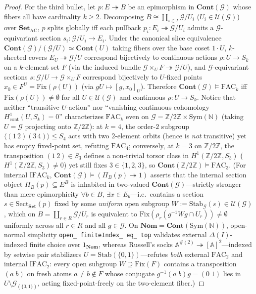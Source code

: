 \begin{proof}
For the third bullet, let $p : E \twoheadrightarrow B$ be an epimorphism in $\mathbf{Cont}(\mathcal{G})$ whose fibers all have cardinality $k \ge 2$. Decomposing $B \cong \coprod_{i \in I} \mathcal{G}/U_i$ ($U_i \in \mathcal{U}(\mathcal{G})$) over $\mathbf{Set}_{\mathrm{AC}}$, $p$ splits globally iff each pullback $p_i : E_i \twoheadrightarrow \mathcal{G}/U_i$ admits a $\mathcal{G}$-equivariant section $s_i : \mathcal{G}/U_i \to E_i$. Under the canonical slice equivalence $\mathbf{Cont}(\mathcal{G})/(\mathcal{G}/U) \simeq \mathbf{Cont}(U)$ taking fibers over the base coset $1 \cdot U$, $k$-sheeted covers $E_U \twoheadrightarrow \mathcal{G}/U$ correspond bijectively to continuous actions $\rho : U \to S_k$ on a $k$-element set $F$ (via the induced bundle $\mathcal{G} \times_U F \twoheadrightarrow \mathcal{G}/U$), and $\mathcal{G}$-equivariant sections $s : \mathcal{G}/U \to \mathcal{G} \times_U F$ correspond bijectively to $U$-fixed points $x_0 \in F^U = \mathrm{Fix}(\rho(U))$ (via $g U \mapsto [g, x_0]_U$). Therefore $\mathbf{Cont}(\mathcal{G}) \models \mathrm{FAC}_k$ iff $\mathrm{Fix}(\rho(U)) \neq \emptyset$ for all $U \in \mathcal{U}(\mathcal{G})$ and continuous $\rho : U \to S_k$. Notice that neither ``transitive $U$-action'' nor ``vanishing continuous cohomology $H^1_{\mathrm{cont}}(U, S_k) = 0$'' characterizes $\mathrm{FAC}_k$ even on $\mathcal{G} = \mathbb{Z}/2\mathbb{Z} \times \mathrm{Sym}(\mathbb{N})$ (taking $U = \mathcal{G}$ projecting onto $\mathbb{Z}/2\mathbb{Z}$): at $k = 4$, the order-$2$ subgroup $\langle (1\,2)(3\,4) \rangle \le S_4$ acts with two $2$-element orbits (hence is \emph{not} transitive) yet has empty fixed-point set, refuting $\mathrm{FAC}_4$; conversely, at $k = 3$ on $\mathbb{Z}/2\mathbb{Z}$, the transposition $(1\,2) \in S_3$ defines a non-trivial torsor class in $H^1(\mathbb{Z}/2\mathbb{Z}, S_3)$ ($H^1(\mathbb{Z}/2\mathbb{Z}, S_3) \neq 0$) yet still fixes $3 \in \{1, 2, 3\}$, so $\mathbf{Cont}(\mathbb{Z}/2\mathbb{Z}) \models \mathrm{FAC}_3$. (For internal $\mathrm{IFAC}_k$, $\mathbf{Cont}(\mathcal{G}) \models (\Pi_B(p) \twoheadrightarrow 1)$ asserts that the internal section object $\Pi_B(p) \subseteq E^B$ is inhabited in two-valued $\mathbf{Cont}(\mathcal{G})$---strictly stronger than mere epimorphicity $\forall b \in B,\, \exists x \in E_b$---i.e.\ contains a section $s \in \mathrm{Sect}_{\mathbf{Set}}(p)$ fixed by some \emph{uniform} open subgroup $W := \mathrm{Stab}_{\mathcal{G}}(s) \in \mathcal{U}(\mathcal{G})$, which on $B = \coprod_{r \in R} \mathcal{G}/U_r$ is equivalent to $\mathrm{Fix}(\rho_r(g^{-1} W g \cap U_r)) \neq \emptyset$ uniformly across all $r \in R$ and all $g \in \mathcal{G}$. On $\mathbf{Nom} = \mathbf{Cont}(\mathrm{Sym}(\mathbb{N}))$, open-normal simplicity \texttt{open\_ finiteIndex\_ eq\_ top} validates external $\Delta(I)$-indexed finite choice over $1_{\mathbf{Nom}}$, whereas Russell's socks $\mathbb{A}^{\#(2)} \twoheadrightarrow [\mathbb{A}]^2$---indexed by setwise pair stabilizers $U = \mathrm{Stab}(\{0,1\})$---refutes \emph{both} external $\mathrm{FAC}_2$ and internal $\mathrm{IFAC}_2$: every open subgroup $W \supseteq \mathrm{Fix}(F)$ contains a transposition $(a\;b)$ on fresh atoms $a \neq b \notin F$ whose conjugate $g^{-1}(a\;b)g = (0\;1)$ lies in $U \setminus \mathcal{G}_{(\{0,1\})}$, acting fixed-point-freely on the two-element fiber.)

\end{proof}
